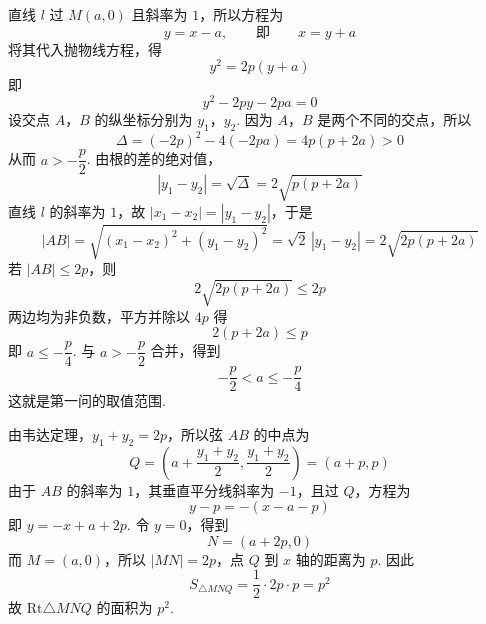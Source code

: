 \begin{solution}
直线 \(l\) 过 \(M(a,0)\) 且斜率为 \(1\)，所以方程为
\[
y=x-a,\qquad\text{即}\qquad x=y+a
\]
将其代入抛物线方程，得
\[
y^2=2p(y+a)
\]
即
\[
y^2-2py-2pa=0
\]
设交点 \(A\)，\(B\) 的纵坐标分别为 \(y_1\)，\(y_2\). 因为 \(A\)，\(B\) 是两个不同的交点，所以
\[
\Delta=(-2p)^2-4(-2pa)=4p(p+2a)>0
\]
从而 \(a>-\dfrac p2\). 由根的差的绝对值，
\[
|y_1-y_2|=\sqrt{\Delta}=2\sqrt{p(p+2a)}
\]
直线 \(l\) 的斜率为 \(1\)，故 \(|x_1-x_2|=|y_1-y_2|\)，于是
\[
|AB|=\sqrt{(x_1-x_2)^2+(y_1-y_2)^2}
=\sqrt2\,|y_1-y_2|
=2\sqrt{2p(p+2a)}
\]
若 \(|AB|\leqslant2p\)，则
\[
2\sqrt{2p(p+2a)}\leqslant2p
\]
两边均为非负数，平方并除以 \(4p\) 得
\[
2(p+2a)\leqslant p
\]
即 \(a\leqslant-\dfrac p4\). 与 \(a>-\dfrac p2\) 合并，得到
\[
-\frac p2<a\leqslant-\frac p4
\]
这就是第一问的取值范围.

由韦达定理，\(y_1+y_2=2p\)，所以弦 \(AB\) 的中点为
\[
Q=\left(a+\frac{y_1+y_2}{2},\frac{y_1+y_2}{2}\right)=(a+p,p)
\]
由于 \(AB\) 的斜率为 \(1\)，其垂直平分线斜率为 \(-1\)，且过 \(Q\)，方程为
\[
y-p=-(x-a-p)
\]
即 \(y=-x+a+2p\). 令 \(y=0\)，得到
\[
N=(a+2p,0)
\]
而 \(M=(a,0)\)，所以 \(|MN|=2p\)，点 \(Q\) 到 \(x\) 轴的距离为 \(p\). 因此
\[
S_{\triangle MNQ}=\frac12\cdot2p\cdot p=p^2
\]
故 \(\mathrm{Rt}\triangle MNQ\) 的面积为 \(p^2\).
\end{solution}
